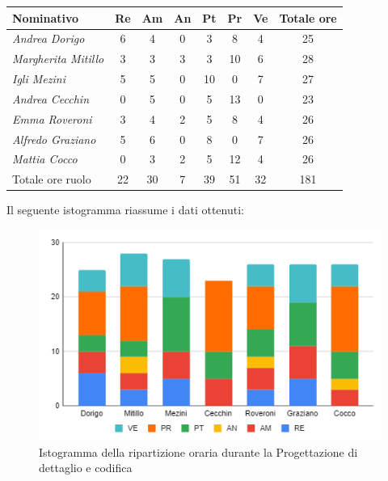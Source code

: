 {{{{{{{{{{{		\begin{center}
			\renewcommand{\arraystretch}{1.4}
			\begin{tabularx}{\textwidth}{|X|c|c|c|c|c|c|c|}
				\hline
				\rowcolor{airforceblue}
				\textbf{Nominativo} & \textbf{Re} & \textbf{Am} & \textbf{An} & \textbf{Pt} & \textbf{Pr} & \textbf{Ve} & \textbf{Totale ore}\\
				\hline
				\textit{Andrea Dorigo} & 6 & 4 & 0 & 3 & 8 & 4 & 25\\
				\hline
				\textit{Margherita Mitillo} & 3 & 3 & 3 & 3 & 10 & 6 & 28\\
				\hline
				\textit{Igli Mezini} & 5 & 5 & 0 & 10 & 0 & 7 & 27\\
				\hline
				\textit{Andrea Cecchin} & 0 & 5 & 0 & 5 & 13 & 0 & 23\\
				\hline
				\textit{Emma Roveroni} & 3 & 4 & 2 & 5 & 8 & 4 & 26\\
				\hline
				\textit{Alfredo Graziano} & 5 & 6 & 0 & 8 & 0 & 7 & 26\\
				\hline
				\textit{Mattia Cocco} & 0 & 3 & 2 & 5 & 12 & 4 & 26\\
				\hline
				Totale ore ruolo & 22 & 30 & 7 & 39 & 51 & 32 & 181\\
				\hline
			\end{tabularx}
		\end{center}
		Il seguente istogramma riassume i dati ottenuti:
		\begin{figure}[!h]
			\begin{center}
				\includegraphics[width=0.7\linewidth]{../immagini/pdp/istogramma_progettazione_dettaglio_periodo2.png}
				\caption{Istogramma della ripartizione oraria durante la Progettazione di
					dettaglio e codifica}
			\end{center}
		\end{figure}
		\clearpage
}}}}}}}}}}}
